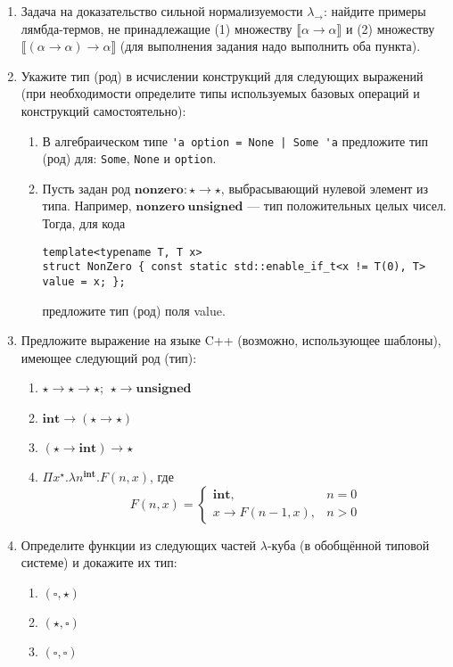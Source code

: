 \documentclass[10pt,a4paper,oneside]{article}
\begin{document}
\begin{enumerate}
\item Задача на доказательство сильной нормализуемости $\lambda_\rightarrow$: найдите примеры лямбда-термов,
не принадлежащие (1) множеству $\llbracket \alpha \rightarrow \alpha\rrbracket$ и (2) множеству $\llbracket (\alpha \rightarrow \alpha) \rightarrow \alpha \rrbracket$
(для выполнения задания надо выполнить оба пункта).
\item Укажите тип (род) в исчислении конструкций для следующих выражений (при необходимости определите
типы используемых базовых операций и конструкций самостоятельно):
\begin{enumerate}
\item В алгебраическом типе \verb!'a option = None | Some 'a! предложите тип (род) для: \verb!Some!,
\verb!None! и \verb!option!.
\item Пусть задан род $\textbf{nonzero}: \star\rightarrow\star$, выбрасывающий нулевой элемент из
типа. Например, $\textbf{nonzero}\ \textbf{unsigned}$ --- тип положительных целых чисел.
Тогда, для кода
\begin{verbatim}
template<typename T, T x>
struct NonZero { const static std::enable_if_t<x != T(0), T> value = x; };
\end{verbatim}
предложите тип (род) поля value.
\end{enumerate}

\item Предложите выражение на языке C++ (возможно, использующее шаблоны), имеющее следующий род (тип):
\begin{enumerate}
\item $\star\rightarrow\star\rightarrow\star$; $\ \star\rightarrow\textbf{unsigned}$
\item $\textbf{int}\rightarrow(\star\rightarrow\star)$
\item $(\star\rightarrow\textbf{int})\rightarrow\star$
\item $\Pi x^\star.\lambda n^\textbf{int}.F(n,x)$, где $$F(n,x) = \left\{\begin{array}{ll}\textbf{int}, & n = 0\\
                                   x\rightarrow F(n-1,x), & n > 0\end{array}\right.$$
\end{enumerate}

\item Определите функции из следующих частей $\lambda$-куба (в обобщённой типовой системе) и докажите их тип:
\begin{enumerate}
\item $(\square,\star)$
\item $(\star,\square)$
\item $(\square,\square)$
\end{enumerate}


\end{enumerate}
\end{document}
